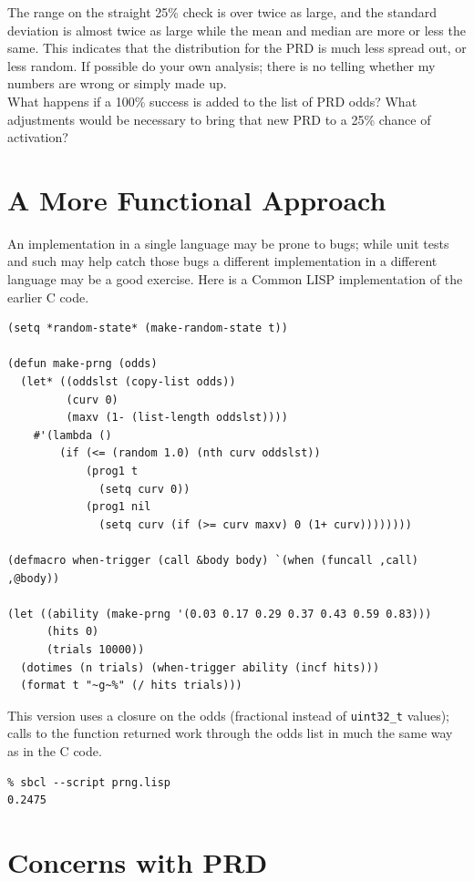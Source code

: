 \documentclass[12pt,a4paper]{article}
\begin{document}
The range on the straight 25\% check is over twice as large, and the
standard deviation is almost twice as large while the mean and median
are more or less the same. This indicates that the distribution for
the PRD is much less spread out, or less random. If possible do your
own analysis; there is no telling whether my numbers are wrong or
simply made up. \\

What happens if a 100\% success is added to the list of PRD odds? What
adjustments would be necessary to bring that new PRD to a
25\% chance of activation?

\section*{A More Functional Approach}

An implementation in a single language may be prone to bugs; while unit
tests and such may help catch those bugs a different implementation in a
different language may be a good exercise. Here is a Common LISP
implementation of the earlier C code.

\begin{verbatim}
(setq *random-state* (make-random-state t))

(defun make-prng (odds)
  (let* ((oddslst (copy-list odds))
         (curv 0)
         (maxv (1- (list-length oddslst))))
    #'(lambda ()
        (if (<= (random 1.0) (nth curv oddslst))
            (prog1 t
              (setq curv 0))
            (prog1 nil
              (setq curv (if (>= curv maxv) 0 (1+ curv))))))))

(defmacro when-trigger (call &body body) `(when (funcall ,call) ,@body))

(let ((ability (make-prng '(0.03 0.17 0.29 0.37 0.43 0.59 0.83)))
      (hits 0)
      (trials 10000))
  (dotimes (n trials) (when-trigger ability (incf hits)))
  (format t "~g~%" (/ hits trials)))
\end{verbatim}

This version uses a closure on the odds (fractional instead of
\texttt{uint32\_t} values); calls to the function returned work through
the odds list in much the same way as in the C code.

\begin{verbatim}
% sbcl --script prng.lisp                             
0.2475    
\end{verbatim}


\section*{Concerns with PRD}
\end{document}
